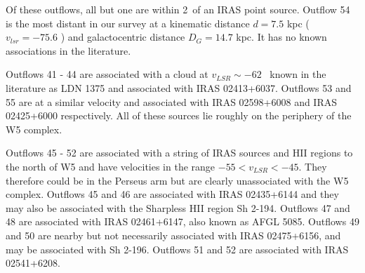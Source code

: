 Of these outflows, all but one are within 2\arcmin\ of an IRAS point source.
Outflow 54 is the most distant in our survey at a kinematic distance $d=7.5$
kpc ($v_{lsr}=-75.6$ \kms) and galactocentric distance $D_G = 14.7$ kpc.  It
has no known associations in the literature.

Outflows 41 - 44 are associated with a cloud at $v_{LSR}\sim -62$ \kms\ known
in the literature as LDN 1375 and associated with IRAS 02413+6037.  Outflows 53
and 55 are at a similar velocity and associated with IRAS 02598+6008 and IRAS
02425+6000 respectively.  All of these sources lie roughly on the periphery of
the W5 complex.

Outflows 45 - 52 are associated with a string of IRAS sources and HII regions
to the north of W5 and have velocities in the range $-55 < v_{LSR} < -45$.
They therefore could be in the Perseus arm but are clearly unassociated with
the W5 complex.  Outflows 45 and 46 are associated with IRAS 02435+6144 and
they may also be associated with the Sharpless HII region Sh 2-194.  Outflows
47 and 48 are associated with IRAS 02461+6147, also known as AFGL 5085.
Outflows 49 and 50 are nearby but not necessarily associated with IRAS
02475+6156, and may be associated with Sh 2-196.  Outflows 51 and 52 are
associated with IRAS 02541+6208.  

% 
 

